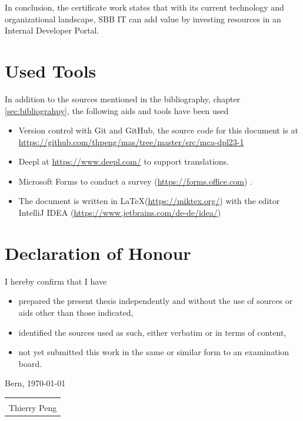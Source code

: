 \documentclass[a4paper,12pt]{article}
\begin{document}
    In conclusion, the certificate work states that with its current technology and organizational landscape, SBB IT
    can add value by investing resources in an Internal Developer Portal.

    \pagebreak


    \tableofcontents
    \pagebreak

    \section*{Used Tools}
    In addition to the sources mentioned in the bibliography, chapter \ref{sec:bibliograhpy}, the following aids and tools have been used
    \begin{itemize}
        \item Version control with Git and GitHub, the source code for this document is at \url{https://github.com/thpeng/mas/tree/master/src/mca-dpl23-1}
        \item Deepl at \url{https://www.deepl.com/} to support translations.
        \item Microsoft Forms to conduct a survey (\url{https://forms.office.com}) .
        \item The document is written in \LaTeX  (\url{https://miktex.org/}) with the editor IntelliJ IDEA (\url{https://www.jetbrains.com/de-de/idea/})
    \end{itemize}

    \section*{Declaration of Honour}

    I hereby confirm that I have
    \begin{itemize}
        \item prepared the present thesis independently and without the use of sources or aids other than those indicated,
        \item identified the sources used as such, either verbatim or in terms of content,
        \item not yet submitted this work in the same or similar form to an examination board.
    \end{itemize}
    Bern, \today\newline
    \newline
    \newline
    \newline
    \begin{tabular}{@{}p{5.0cm}@{}}
        \hrulefill \\
        Thierry Peng
    \end{tabular}
\end{document}
